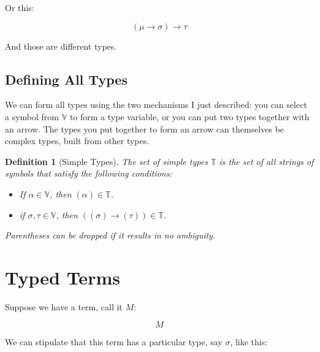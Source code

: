 \documentclass{book}
\numberwithin{equation}{chapter}
\newtheorem{definition}{Definition}
\begin{document}
\noindent
Or this:

\begin{equation}
(\mu \rightarrow \sigma) \rightarrow \tau
\end{equation}

\noindent
And those are different types.


\section{Defining All Types}

We can form all types using the two mechanisms I just described: you can select a symbol from $\mathbb{V}$ to form a type variable, or you can put two types together with an arrow. The types you put together to form an arrow can themselves be complex types, built from other types.

\begin{definition}[Simple Types]
The set of simple types $\mathbb{T}$ is the set of all strings of symbols that satisfy the following conditions:

\begin{itemize}
\item{If $\alpha \in \mathbb{V}$, then $(\alpha) \in \mathbb{T}$.}
\item{if $\sigma, \tau \in \mathbb{V}$, then $((\sigma) \rightarrow (\tau)) \in \mathbb{T}$.}
\end{itemize}

\noindent
Parentheses can be dropped if it results in no ambiguity.

\end{definition}


\chapter{Typed Terms}

Suppose we have a term, call it $M$:

\begin{equation}
M
\end{equation}

\noindent
We can stipulate that this term has a particular type, say $\sigma$, like this:
\end{document}
